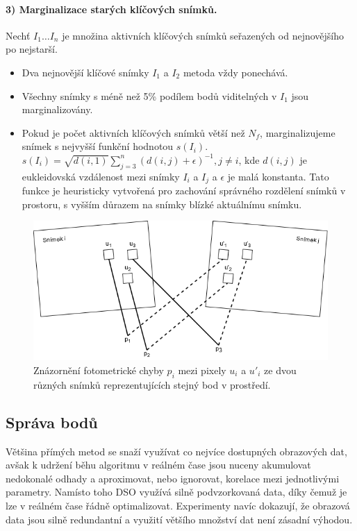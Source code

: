 \documentclass[12pt,a4paper]{report}
\begin{document}
\paragraph*{3) Marginalizace starých klíčových snímků.} Nechť \( I_1 \dots I_n \) je množina aktivních klíčových snímků seřazených od nejnovějšího po nejstarší.
\begin{itemize}
\item Dva nejnovější klíčové snímky \( I_1 \) a \( I_2 \) metoda vždy ponechává.
\item Všechny snímky s méně než 5\% podílem bodů viditelných v \( I_1 \) jsou marginalizovány.
\item Pokud je počet aktivních klíčových snímků větší než \( N_f \), marginalizujeme snímek s nejvyšší funkční hodnotou \( s(I_i) \). \( s(I_i)=\sqrt{d(i,1)} \sum_{j=3}^n (d(i,j)+\epsilon)^{-1}, j\neq i \), kde \( d(i,j) \) je eukleidovská vzdálenost mezi snímky \( I_i \) a \( I_j \) a \( \epsilon \) je  malá konstanta. Tato funkce je heuristicky vytvořená pro zachování správného rozdělení snímků v prostoru, s vyšším důrazem na snímky blízké aktuálnímu snímku.
\end{itemize}

\begin{figure}[H]
\centering
\includegraphics[scale=0.7]{img/photometric_error.png}
\caption{Znázornění fotometrické chyby \(p_i\) mezi pixely \(u_i\) a \(u'_i\) ze dvou různých snímků reprezentujících stejný bod v prostředí.}
\label{p_error}
\end{figure}

\subsection*{Správa bodů}
Většina přímých metod se snaží využívat co nejvíce dostupných obrazových dat, avšak k udržení běhu algoritmu v reálném čase jsou nuceny akumulovat nedokonalé odhady a aproximovat, nebo ignorovat, korelace mezi jednotlivými parametry. Namísto toho DSO využívá silně podvzorkovaná data, díky čemuž je lze v reálném čase řádně optimalizovat. Experimenty navíc dokazují, že obrazová data jsou silně redundantní a využití většího množství dat není zásadní výhodou. 
\end{document}
